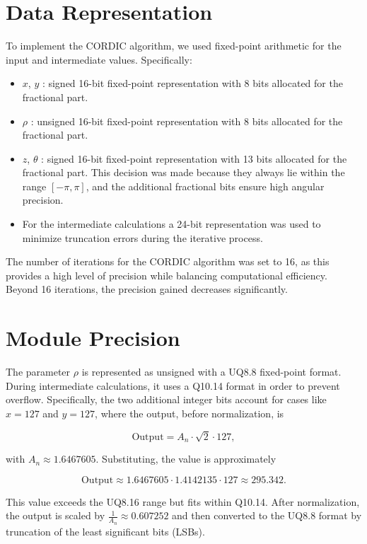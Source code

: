 \section{Data Representation}

To implement the CORDIC algorithm, we used fixed-point arithmetic for the input and intermediate values. Specifically:

\begin{itemize}
    \item \( x \), \( y \) : signed 16-bit fixed-point representation with 8 bits allocated for the fractional part.
    \item \( \rho \) : unsigned 16-bit fixed-point representation with 8 bits allocated for the fractional part.
    \item \( z \), \( \theta \) : signed 16-bit fixed-point representation with 13 bits allocated for the fractional part. This decision was made because they always lie within the range \( [-\pi, \pi] \), and the additional fractional bits ensure high angular precision.
    \item For the intermediate calculations a 24-bit representation was used to minimize truncation errors during the iterative process.
\end{itemize}

The number of iterations for the CORDIC algorithm was set to 16, as this provides a high level of precision while balancing computational efficiency. Beyond 16 iterations, the precision gained decreases significantly.

\section{Module Precision}
The parameter \( \rho \) is represented as unsigned with a UQ8.8 fixed-point format. During intermediate calculations, it uses a Q10.14 format in order to prevent overflow. Specifically, the two additional integer bits account for cases like \( x = 127 \) and \( y = 127 \), where the output, before normalization, is

\[
\text{Output} = A_n \cdot \sqrt{2} \cdot 127,
\]

with \( A_n \approx 1.6467605 \). Substituting, the value is approximately 

\[
\text{Output} \approx 1.6467605 \cdot 1.4142135 \cdot 127 \approx 295.342.
\]

This value exceeds the UQ8.16 range but fits within Q10.14. After normalization, the output is scaled by \( \frac{1}{A_n} \approx 0.607252 \) and then converted to the UQ8.8 format by truncation of the least significant bits (LSBs).

